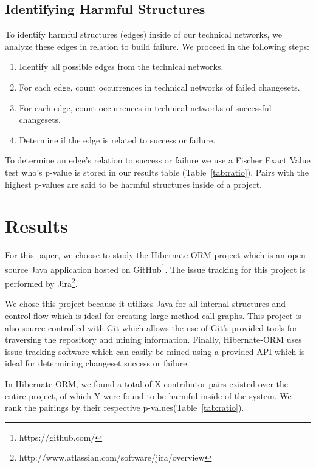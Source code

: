 \documentclass[conference]{IEEEtran}
\begin{document}
\subsection{Identifying Harmful Structures}
To identify harmful structures (edges) inside of our technical networks, we analyze these 
edges in relation to build failure. We proceed in the following steps:

\begin{enumerate}
\item Identify all possible edges from the technical networks.
\item For each edge, count occurrences in technical networks of failed changesets.
\item For each edge, count occurrences in technical networks of successful changesets.
\item Determine if the edge is related to success or failure.
\end{enumerate}

To determine an edge's relation to success or failure we use a Fischer Exact Value test
who's p-value is stored in our results table (Table~\ref{tab:ratio}). Pairs with the highest
p-values are said to be harmful structures inside of a project.

\section{Results}
For this paper, we choose to study the Hibernate-ORM project which is an open source Java 
application hosted on GitHub\footnote{https://github.com/}. The issue tracking for this 
project is performed by Jira\footnote{http://www.atlassian.com/software/jira/overview}.

We chose this project because it utilizes Java for all internal structures and control flow which
is ideal for creating large method call graphs. This project is also source controlled with Git
which allows the use of Git's provided tools for traversing the repository and mining
information. Finally, Hibernate-ORM uses issue tracking software which can easily be mined
using a provided API which is ideal for determining changeset success or failure.

In Hibernate-ORM, we found a total of X contributor pairs existed over the entire project, 
of which Y were found to be harmful inside of the system. We rank the pairings by their 
respective p-values(Table~\ref{tab:ratio}).
\end{document}
